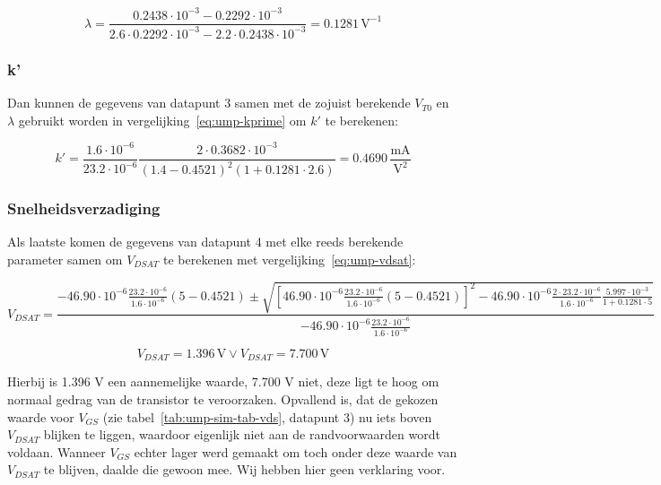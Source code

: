 \documentclass{scrartcl}
\begin{document}
\begin{equation} \label{ump-lambda-num}
	\lambda = \frac{0.2438 \cdot 10^{-3} - 0.2292 \cdot 10^{-3}}{2.6 \cdot 0.2292 \cdot 10^{-3} - 2.2 \cdot 0.2438 \cdot 10^{-3}} = 0.1281 \, \textrm{V}^{-1}
\end{equation}

\subsubsection{k'}
\label{subsubsec:ump-res-val-kprime}
Dan kunnen de gegevens van datapunt 3 samen met de zojuist berekende $V_{T0}$ en $\lambda$ gebruikt worden in vergelijking~\ref{eq:ump-kprime} om $k'$ te berekenen:

\begin{equation} \label{eq:ump-kprime-num}
	k' = \frac{1.6 \cdot 10^{-6}}{23.2 \cdot 10^{-6}}\frac{2 \cdot 0.3682 \cdot 10^{-3}}{(1.4 - 0.4521)^2(1 + 0.1281 \cdot 2.6)} = 0.4690 \,\frac{\textrm{mA}}{\textrm{V}^{2}}
\end{equation}

\subsubsection{Snelheidsverzadiging}
\label{subsubsec:ump-res-val-vdsat}
Als laatste komen de gegevens van datapunt 4 met elke reeds berekende parameter samen om $V_{DSAT}$ te berekenen met vergelijking~\ref{eq:ump-vdsat}:

\begin{equation} \label{eq:ump-vdsat-num}
	V_{DSAT} = \frac{-46.90 \cdot 10^{-6}\frac{23.2 \cdot 10^{-6}}{1.6 \cdot 10^{-6}}(5-0.4521) \pm \sqrt{[46.90 \cdot 10^{-6}\frac{23.2 \cdot 10^{-6}}{1.6 \cdot 10^{-6}}(5-0.4521)]^2 - 46.90 \cdot 10^{-6}\frac{2 \cdot 23.2 \cdot 10^{-6}}{1.6 \cdot 10^{-6}}\frac{5.997 \cdot 10^{-3}}{1 + 0.1281 \cdot 5}}}{-46.90 \cdot 10^{-6}\frac{23.2 \cdot 10^{-6}}{1.6 \cdot 10^{-6}}}	
\end{equation}

$$V_{DSAT} = 1.396 \, \textrm{V} \vee V_{DSAT} = 7.700 \, \textrm{V}$$

Hierbij is 1.396 V een aannemelijke waarde, 7.700 V niet, deze ligt te hoog om normaal gedrag van de transistor te veroorzaken. Opvallend is, dat de gekozen waarde voor $V_{GS}$ (zie tabel~\ref{tab:ump-sim-tab-vds}, datapunt 3) nu iets boven $V_{DSAT}$ blijken te liggen, waardoor eigenlijk niet aan de randvoorwaarden wordt voldaan. Wanneer $V_{GS}$ echter lager werd gemaakt om toch onder deze waarde van $V_{DSAT}$ te blijven, daalde die gewoon mee. Wij hebben hier geen verklaring voor.
\end{document}
